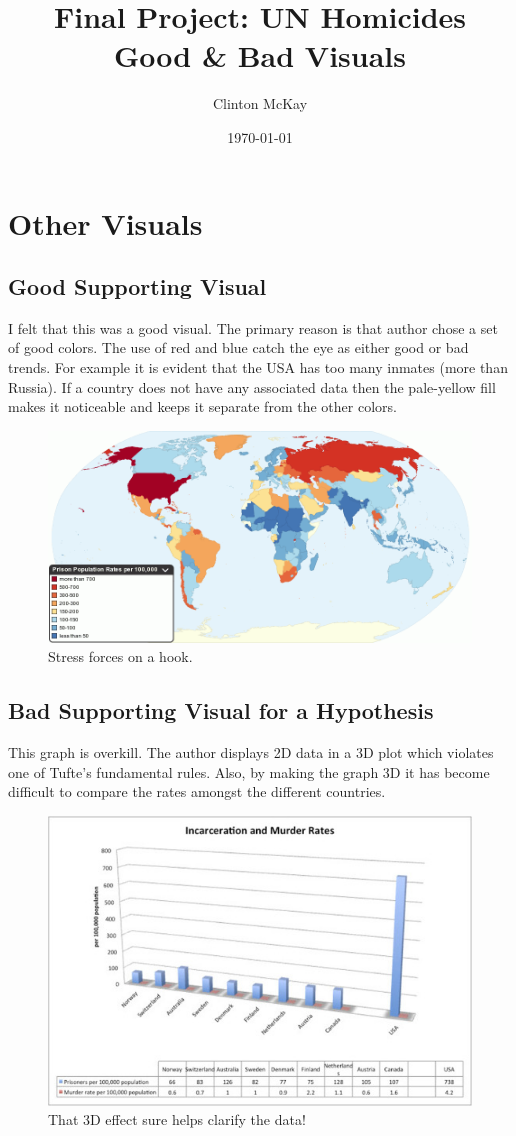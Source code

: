 \documentclass[12pt]{article}
\title{Final Project: UN Homicides\\ {\Large Good \& Bad Visuals}}
\date{\today}
\author{Clinton McKay}
\begin{document}
\maketitle

\section{Other Visuals}

\subsection{Good Supporting Visual} 
I felt that this was a good visual. The primary reason is that author chose a set of good colors. The use of red and blue catch the eye as either good or bad trends. For example it is evident that the USA has too many inmates (more than Russia). If a country does not have any associated data then the pale-yellow fill makes it noticeable and keeps it separate from the other colors.

\begin{figure}[!ht]
    \centering
    \includegraphics[width=6in, keepaspectratio]{good-visual.png}
    \caption{Stress forces on a hook.}
    \label{fig:example_good}
\end{figure}

\subsection{Bad Supporting Visual for a Hypothesis}
This graph is overkill. The author displays 2D data in a 3D plot which violates one of Tufte's fundamental rules. Also, by making the graph 3D it has become difficult to compare the rates amongst the different countries. 

\begin{figure}[!ht]
    \centering
    \includegraphics[width=6in, keepaspectratio]{bad-visual.jpg}
    \caption{That 3D effect sure helps clarify the data!}
    \label{fig:example_bad}
\end{figure}
\end{document}
